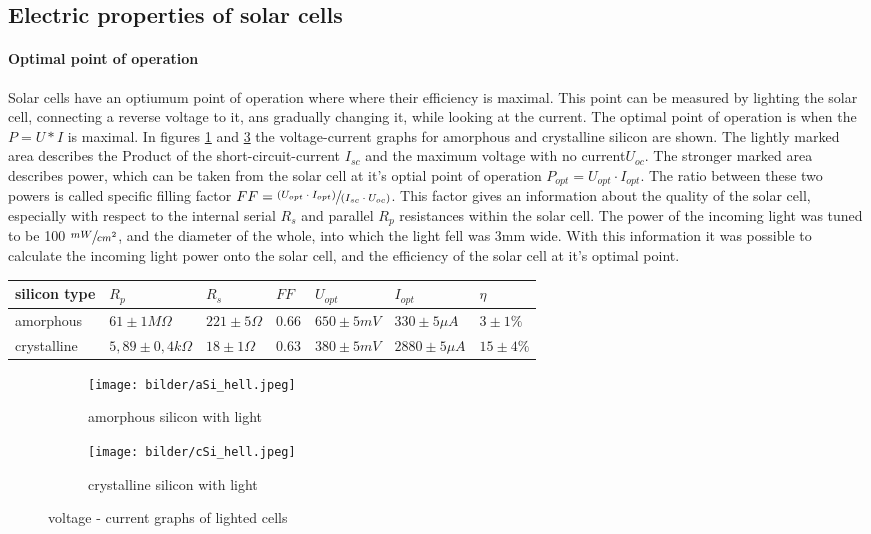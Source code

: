 \subsection{Electric properties of solar cells}
\paragraph{Optimal point of operation}
Solar cells have an optiumum point of operation where where their efficiency is maximal.
This point can be measured by lighting the solar cell, connecting a reverse voltage to it,
ans gradually changing it, while looking at the current. The optimal point of operation
is when the $P = U * I$ is maximal.
In figures \ref{fig:asi_hell} and \ref{fig:csi_hell} the voltage-current graphs 
for amorphous and crystalline silicon are shown. The lightly marked area describes the
Product of the short-circuit-current $I_{sc}$ and the maximum voltage with no current$U_{oc}$. 
The stronger marked area describes power, which can be taken from the solar cell
at it's optial point of operation $P_{opt} = U_{opt} \cdot I_{opt}$. The ratio between these two powers is called
specific filling factor $FF = \sfrac{(U_{opt} \cdot I_{opt})}{(I_{sc} \cdot U_{oc})}$. This factor gives an information about the quality of the solar cell, especially with respect to the internal
serial $R_s$ and parallel $R_p$ resistances within the solar cell. The power of the incoming light
was tuned to be 100 $\sfrac{mW}{cm^2}$, and the diameter of the whole, into which the light fell was 3mm wide.
With this information it was possible to calculate the incoming light power onto the solar cell, and the efficiency of the solar cell at it's optimal point.
\newline
\begin{center}
\begin{tabular}{|l|l|l|l|l|l|l|}
  \hline
  silicon type &  $R_p$ & $R_s$ & $FF$ & $U_{opt}$ & $I_{opt}$ & $\eta$ \\ \hline
  amorphous    & $61 \pm 1 M\Omega$  & $221 \pm 5\Omega$ & 0.66 & $ 650 \pm 5 mV$ & $330 \pm 5\mu A$ & $3 \pm 1 \%$ \\ \hline
  crystalline  & $5,89 \pm 0,4 k\Omega$ & $18 \pm 1 \Omega$ & 0.63 & $380 \pm 5 mV$ & $2880 \pm 5 \mu A$ & $15 \pm 4\%$ \\ \hline
\end{tabular}
\end{center}
\begin{figure}[h]
  \centering
  \begin{subfigure}[b]{0.45\textwidth}
    \texttt{[image: bilder/aSi\_hell.jpeg]}
    \caption{amorphous silicon with light}
    \label{fig:asi_hell}
  \end{subfigure}
  \begin{subfigure}[b]{0.45\textwidth}
    \texttt{[image: bilder/cSi\_hell.jpeg]}
    \caption{crystalline silicon with light}
    \label{fig:csi_hell}
  \end{subfigure}
  \caption{voltage - current graphs of lighted cells}
\end{figure}

